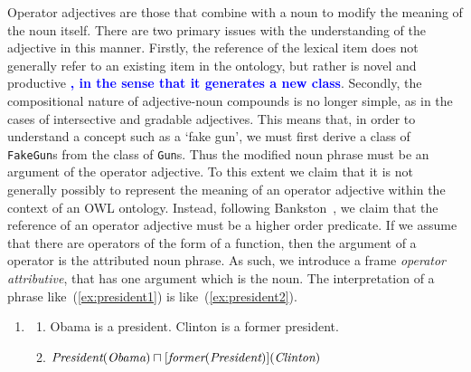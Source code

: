 \documentclass[11pt]{article}
\begin{document}
Operator adjectives are those that combine with a noun to modify the meaning of the noun itself. 
There are two primary issues with the understanding of the adjective in this manner. 
Firstly, the reference of the lexical item does not generally refer to an existing item 
in the ontology, but rather is novel and productive \textbf{\textcolor{blue}{, in the sense that it generates a new class}}. Secondly, the compositional nature 
of adjective-noun compounds is no longer simple, as in the cases of intersective and gradable adjectives.
This means that, in order to understand a concept such as a `fake gun', we must first
derive a class of {\tt FakeGun}s from the class of {\tt Gun}s. Thus the modified noun phrase
must be an argument of the operator adjective.
To this extent we claim that it is not generally possibly to represent the 
meaning of an operator adjective within the context of an OWL ontology.
Instead, following Bankston~\cite{bankston2003modeling}, we claim that
the reference of an operator adjective must be a higher order predicate.
If we assume that there are operators of the form of a function, then
the argument of a operator is the attributed noun phrase. As such, we introduce a frame \emph{operator attributive}, that has one argument
which is the noun. The interpretation of a phrase like~(\ref{ex:president1}) is like~(\ref{ex:president2}).

\begin{enumerate}
\item \begin{enumerate}
\item Obama is a president. Clinton is a former president. \label{ex:president1}
\item $\text{\em President}(\text{\em Obama}) \sqcap [\text{\em former}(\text{\em President})](\text{\em Clinton})$ \label{ex:president2}
\end{enumerate}
\end{enumerate}
\end{document}
